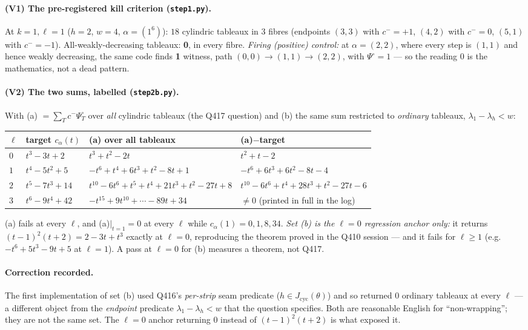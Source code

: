 \documentclass[11pt]{article}
\theoremstyle{plain}
\theoremstyle{definition}
\newcommand{\Jcyc}{J_{\mathrm{cyc}}}
\newcommand{\Psiop}{\Psi^{\circ}}
\begin{document}
\paragraph{(V1) The pre-registered kill criterion (\texttt{step1.py}).}
At $k=1,\ell=1$ ($h=2$, $w=4$, $\alpha=(1^6)$): $18$ cylindric tableaux in $3$ fibres
(endpoints $(3,3)$ with $c^-=+1$, $(4,2)$ with $c^-=0$, $(5,1)$ with $c^-=-1$).
All-weakly-decreasing tableaux: \textbf{0}, in every fibre.
\emph{Firing (positive) control:} at $\alpha=(2,2)$, where every step is $(1,1)$ and hence weakly
decreasing, the same code finds \textbf{1} witness, path $(0,0)\to(1,1)\to(2,2)$, with
$\Psiop=1$ --- so the reading $0$ is the mathematics, not a dead pattern.

\paragraph{(V2) The two sums, labelled (\texttt{step2b.py}).}
With (a) $=\sum_T c^-\Psiop_T$ over \emph{all} cylindric tableaux (the Q417 question) and
(b) the same sum restricted to \emph{ordinary} tableaux, $\lambda_1-\lambda_h<w$:

\medskip
\noindent\begin{tabular}{@{}llll@{}}
\hline
$\ell$ & target $c_\alpha(t)$ & (a) over all tableaux & (a)$-$target\\
\hline
$0$ & $t^3-3t+2$ & $t^3+t^2-2t$ & $t^2+t-2$\\
$1$ & $t^4-5t^2+5$ & $-t^6+t^4+6t^3+t^2-8t+1$ & $-t^6+6t^3+6t^2-8t-4$\\
$2$ & $t^5-7t^3+14$ & $t^{10}-6t^6+t^5+t^4+21t^3+t^2-27t+8$ & $t^{10}-6t^6+t^4+28t^3+t^2-27t-6$\\
$3$ & $t^6-9t^4+42$ & $-t^{15}+9t^{10}+\cdots-89t+34$ & $\ne0$ (printed in full in the log)\\
\hline
\end{tabular}
\medskip

\noindent (a) fails at every $\ell$, and (a)$\big|_{t=1}=0$ at every $\ell$ while
$c_\alpha(1)=0,1,8,34$. \emph{Set (b) is the $\ell=0$ regression anchor only:} it returns
$(t-1)^2(t+2)=2-3t+t^3$ exactly at $\ell=0$, reproducing the theorem proved in the Q410 session
--- and it fails for $\ell\ge1$ (e.g.\ $-t^6+5t^3-9t+5$ at $\ell=1$). A pass at $\ell=0$ for (b)
measures a theorem, not Q417.

\paragraph{Correction recorded.} The first implementation of set (b) used Q416's
\emph{per-strip} seam predicate ($h\in\Jcyc(\theta)$) and so returned $0$ ordinary tableaux at
every $\ell$ --- a different object from the \emph{endpoint} predicate
$\lambda_1-\lambda_h<w$ that the question specifies. Both are reasonable English for
``non-wrapping''; they are not the same set. The $\ell=0$ anchor returning $0$ instead of
$(t-1)^2(t+2)$ is what exposed it.
\end{document}
